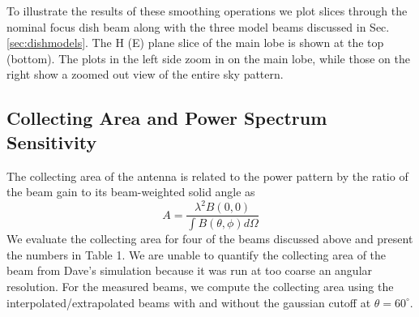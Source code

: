 \documentclass{emulateapj}
\begin{document}


To illustrate the results of these smoothing operations we plot slices through the nominal focus dish beam along with the three model beams discussed in Sec. \ref{sec:dishmodels}. The H (E) plane slice of the main lobe is shown at the top (bottom). The plots in the left side zoom in on the main lobe, while those on the right show a zoomed out view of the entire sky pattern. 

\subsection{Collecting Area and Power Spectrum Sensitivity}

The collecting area of the antenna is related to the power pattern by the ratio of the beam gain to its beam-weighted solid angle as
\begin{equation}
	A=\frac{\lambda^2 B(0,0)}{\int B(\theta,\phi)d\Omega}
\end{equation}
We evaluate the collecting area for four of the beams discussed above and present the numbers in Table 1. We are unable to quantify the collecting area of the beam from Dave's simulation because it was run at too coarse an angular resolution. For the measured beams, we compute the collecting area using the interpolated/extrapolated beams with and without the gaussian cutoff at $\theta=60^\circ$.
\end{document}
